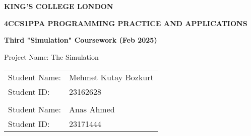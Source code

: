 \documentclass[10pt, a4paper]{scrartcl}
\begin{document}

    \begin{titlepage}
        \begin{center}
            \LARGE
            \textbf{KING'S COLLEGE LONDON}

            \vspace{2cm}

            \begin{adjustwidth}{-1cm}{-1cm}
                \centering
                \Large
                \textbf{4CCS1PPA PROGRAMMING PRACTICE AND APPLICATIONS}
            \end{adjustwidth}

            \vspace{0.5cm}

            \Large
            \textbf{Third "Simulation" Coursework (Feb 2025)}

            \vspace{2cm}

            \Large
            Project Name: The Simulation

            \vspace{1cm}

            \Large
            \begin{tabular}{l l}
                Student Name: & Mehmet Kutay Bozkurt \\
                Student ID: & 23162628 \\
                \vspace{0.5cm} & \\
                Student Name: & Anas Ahmed \\
                Student ID: & 23171444\end{tabular}
        \end{center}
    \end{titlepage}
\end{document}
